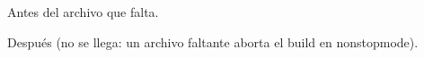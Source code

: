 \documentclass{article}
\begin{document}
Antes del archivo que falta.



Después (no se llega: un archivo faltante aborta el build en nonstopmode).
\end{document}

